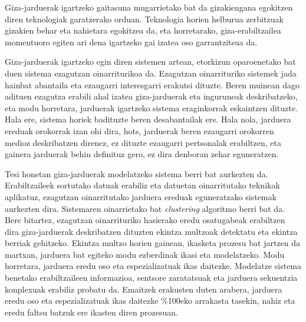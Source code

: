 \begin{laburpena}        %
 
 
 Giza-jarduerak igartzeko gaitasuna mugarrietako bat da gizakiengana egokitzen diren teknologiak garatzerako orduan. Teknologia horien helburua zerbitzuak gizakien behar eta nahietara egokitzea da, eta horretarako, giza-erabiltzailea momentuoro egiten ari dena igartzeko gai izatea oso garrantzitsua da.
 
 Giza-jarduerak igartzeko egin diren sistemen artean, etorkizun oparoenetako bat duen sistema ezagutzan oinarriturikoa da. Ezagutzan oinarrituriko sistemek jada hainbat abantaila eta ezaugarri interesgarri erakutsi dituzte. Beren muinean dago adituen ezagutza erabili ahal izatea giza-jarduerak eta inguruneak deskribatzeko, eta modu horretara, jarduerak igartzeko sistema eraginkorrak eskaintzen dituzte. Hala ere, sistema horiek badituzte beren desabantailak ere. Hala nola, jarduera ereduak orokorrak izan ohi dira, hots, jarduerak beren ezaugarri orokorren medioz deskribatzen direnez, ez dituzte ezaugarri pertsonalak erabiltzen, eta gainera jarduerak behin definituz gero, ez dira denboran zehar eguneratzen.
 
 Tesi honetan giza-jarduerak modelatzeko sistema berri bat aurkezten da. Erabiltzaileek sortutako datuak erabiliz eta datuetan oinarritutako teknikak aplikatuz, ezagutzan oinarritutako jarduera ereduak eguneratzako sistemak aurkezten dira. Sistemaren oinarrietako bat \textit{clustering} algoritmo berri bat da. Bere bitartez, ezagutzan oinarrituriko hasierako eredu osatugabeak erabiltzen dira giza-jarduerak deskribatzen dituzten ekintza multzoak detektatu eta ekintza berriak gehitzeko. Ekintza multzo horien gainean, ikasketa prozesu bat jartzen da martxan, jarduera bat egiteko modu ezberdinak ikasi eta modelatzeko. Modu horretara, jarduera eredu oso eta espezializatuak ikas daitezke. Modelatze sistema benetako erabiltzaileen informazioa, sentsore zaratatsuak eta jarduera sekuentzia konplexuak erabiliz probatu da. Emaitzek erakusten duten arabera, jarduera eredu oso eta espezializatuak ikas daitezke \%100eko arrakasta tasekin, nahiz eta eredu faltsu batzuk ere ikasten diren prozesuan.
 
\end{laburpena}





